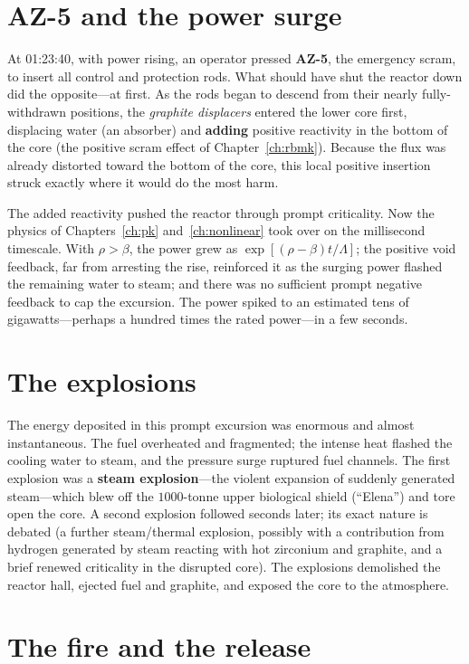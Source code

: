 \section{AZ-5 and the power surge}

At 01:23:40, with power rising, an operator pressed \textbf{AZ-5}, the emergency
scram, to insert all control and protection rods. What should have shut the
reactor down did the opposite---at first. As the rods began to descend from their
nearly fully-withdrawn positions, the \emph{graphite displacers} entered the lower
core first, displacing water (an absorber) and \textbf{adding} positive reactivity
in the bottom of the core (the positive scram effect of Chapter~\ref{ch:rbmk}).
Because the flux was already distorted toward the bottom of the core, this local
positive insertion struck exactly where it would do the most harm.

The added reactivity pushed the reactor through prompt criticality. Now the
physics of Chapters~\ref{ch:pk} and~\ref{ch:nonlinear} took over on the
millisecond timescale. With $\rho>\beta$, the power grew as
$\exp[(\rho-\beta)t/\Lambda]$; the positive void feedback, far from arresting the
rise, reinforced it as the surging power flashed the remaining water to steam; and
there was no sufficient prompt negative feedback to cap the excursion. The power
spiked to an estimated tens of gigawatts---perhaps a hundred times the rated
power---in a few seconds.

\section{The explosions}

The energy deposited in this prompt excursion was enormous and almost
instantaneous. The fuel overheated and fragmented; the intense heat flashed the
cooling water to steam, and the pressure surge ruptured fuel channels. The first
explosion was a \textbf{steam explosion}---the violent expansion of suddenly
generated steam---which blew off the $1000$-tonne upper biological shield
(``Elena'') and tore open the core. A second explosion followed seconds later;
its exact nature is debated (a further steam/thermal explosion, possibly with a
contribution from hydrogen generated by steam reacting with hot zirconium and
graphite, and a brief renewed criticality in the disrupted core). The explosions
demolished the reactor hall, ejected fuel and graphite, and exposed the core to
the atmosphere.

\section{The fire and the release}

